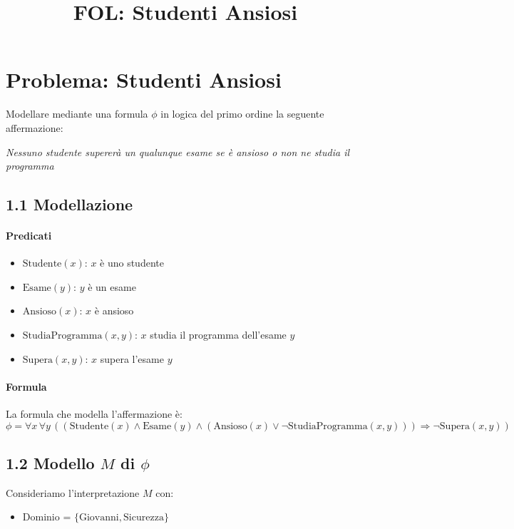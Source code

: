 \documentclass[a4paper,11pt]{article}
\title{FOL: Studenti Ansiosi}
\date{}
\begin{document}
\maketitle

\section*{Problema: Studenti Ansiosi}
Modellare mediante una formula $\phi$ in logica del primo ordine la seguente affermazione:

\textit{Nessuno studente supererà un qualunque esame se è ansioso o non ne studia il programma}

\subsection*{1.1 Modellazione}


\paragraph{Predicati}
\begin{itemize}
  \item $\mathrm{Studente}(x)$: $x$ è uno studente
  \item $\mathrm{Esame}(y)$: $y$ è un esame
  \item $\mathrm{Ansioso}(x)$: $x$ è ansioso
  \item $\mathrm{StudiaProgramma}(x, y)$: $x$ studia il programma dell'esame $y$
  \item $\mathrm{Supera}(x, y)$: $x$ supera l'esame $y$
\end{itemize}

\paragraph{Formula}

La formula che modella l'affermazione è:
\[
\phi = \forall x \, \forall y \,
\left(
  \left(
    \mathrm{Studente}(x) \land \mathrm{Esame}(y) \land
    \left( \mathrm{Ansioso}(x) \lor \neg \mathrm{StudiaProgramma}(x, y) \right)
  \right)
\Rightarrow
\neg \mathrm{Supera}(x, y)
\right)
\]

\newpage

\subsection*{1.2 Modello $M$ di $\phi$}

Consideriamo l'interpretazione $M$ con:
\begin{itemize}
  \item Dominio = $\{\mathrm{Giovanni}, \mathrm{Sicurezza}\}$
\end{itemize}
\end{document}

